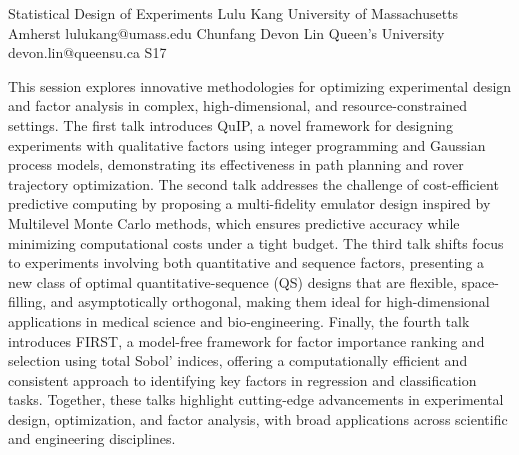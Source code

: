 \begin{session}
 {Statistical Design of Experiments}%
 {Lulu Kang}%
 {University of Massachusetts Amherst}%
 {lulukang@umass.edu}%
 {Chunfang Devon Lin}%
 {Queen's University}%
 {devon.lin@queensu.ca}%
 {S17}%
{}

 \medskip
 This session explores innovative methodologies for optimizing experimental design and factor analysis in complex, high-dimensional, and resource-constrained settings. The first talk introduces QuIP, a novel framework for designing experiments with qualitative factors using integer programming and Gaussian process models, demonstrating its effectiveness in path planning and rover trajectory optimization. The second talk addresses the challenge of cost-efficient predictive computing by proposing a multi-fidelity emulator design inspired by Multilevel Monte Carlo methods, which ensures predictive accuracy while minimizing computational costs under a tight budget. The third talk shifts focus to experiments involving both quantitative and sequence factors, presenting a new class of optimal quantitative-sequence (QS) designs that are flexible, space-filling, and asymptotically orthogonal, making them ideal for high-dimensional applications in medical science and bio-engineering. Finally, the fourth talk introduces FIRST, a model-free framework for factor importance ranking and selection using total Sobol' indices, offering a computationally efficient and consistent approach to identifying key factors in regression and classification tasks. Together, these talks highlight cutting-edge advancements in experimental design, optimization, and factor analysis, with broad applications across scientific and engineering disciplines.
\end{session}



\clearpage

